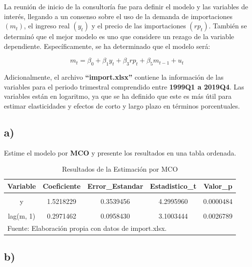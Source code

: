 \documentclass[
  11pt,
  letterpaper,
  DIV=11,
  numbers=noendperiod]{scrartcl}
\begin{document}
La reunión de inicio de la consultoría fue para definir el modelo y las
variables de interés, llegando a un consenso sobre el uso de la demanda
de importaciones \((m_t)\), el ingreso real \((y_t)\) y el precio de las
importaciones \((rp_t)\). También se determinó que el mejor modelo es
uno que considere un rezago de la variable dependiente. Específicamente,
se ha determinado que el modelo será:

\[
m_t = \beta_0 + \beta_1 y_t + \beta_3 rp_t + \beta_5 m_{t-1} + u_t
\]

Adicionalmente, el archivo \textbf{``import.xlsx''} contiene la
información de las variables para el periodo trimestral comprendido
entre \textbf{1999Q1 a 2019Q4}. Las variables están en logaritmo, ya que
se ha definido que este es más útil para estimar elasticidades y efectos
de corto y largo plazo en términos porcentuales.

\subsection{a)}\label{a}

Estime el modelo por \textbf{MCO} y presente los resultados en una tabla
ordenada.

\begingroup\fontsize{10}{12}\selectfont

\begin{longtable}[t]{ccccc}
\caption{\label{tab:unnamed-chunk-26}Resultados de la Estimación por MCO}\\
\toprule
Variable & Coeficiente & Error\_Estandar & Estadistico\_t & Valor\_p\\
\midrule
\cellcolor{gray!10}{(Intercept)} & \cellcolor{gray!10}{-0.6413473} & \cellcolor{gray!10}{1.4382908} & \cellcolor{gray!10}{-0.4459093} & \cellcolor{gray!10}{0.6568825}\\
y & 1.5218229 & 0.3539456 & 4.2995960 & 0.0000484\\
\cellcolor{gray!10}{rp} & \cellcolor{gray!10}{-0.6654936} & \cellcolor{gray!10}{0.1443810} & \cellcolor{gray!10}{-4.6092867} & \cellcolor{gray!10}{0.0000153}\\
lag(m, 1) & 0.2971462 & 0.0958430 & 3.1003444 & 0.0026789\\
\bottomrule
\multicolumn{5}{l}{\rule{0pt}{1em}Fuente: Elaboración propia con datos de import.xlsx.}\\
\end{longtable}
\endgroup{}

\subsection{b)}\label{b}
\end{document}
